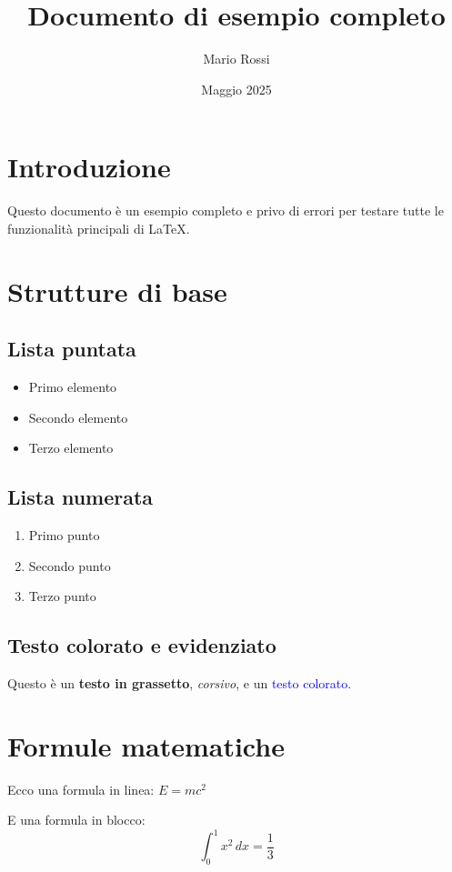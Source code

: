 \documentclass[a4paper,12pt]{article}
\title{Documento di esempio completo}
\author{Mario Rossi}
\date{Maggio 2025}
\begin{document}
\maketitle

\tableofcontents
\newpage

\section{Introduzione}
Questo documento è un esempio completo e privo di errori per testare tutte le funzionalità principali di \LaTeX.

\section{Strutture di base}

\subsection{Lista puntata}
\begin{itemize}
  \item Primo elemento
  \item Secondo elemento
  \item Terzo elemento
\end{itemize}

\subsection{Lista numerata}
\begin{enumerate}
  \item Primo punto
  \item Secondo punto
  \item Terzo punto
\end{enumerate}

\subsection{Testo colorato e evidenziato}
Questo è un \textbf{testo in grassetto}, \textit{corsivo}, e un \textcolor{blue}{testo colorato}.

\section{Formule matematiche}

Ecco una formula in linea: \( E = mc^2 \)

E una formula in blocco:
\[
\int_0^1 x^2 \, dx = \frac{1}{3}
\]
\end{document}
